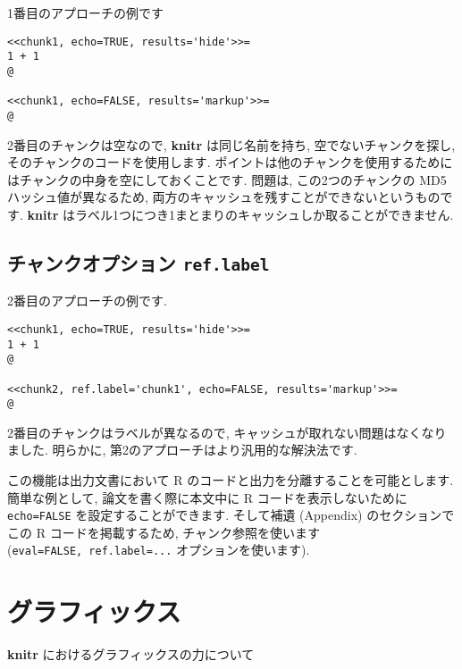 \documentclass[
]{bxjsreport}
\begin{document}
1番目のアプローチの例です

\begin{verbatim}
<<chunk1, echo=TRUE, results='hide'>>=
1 + 1
@

<<chunk1, echo=FALSE, results='markup'>>=
@
\end{verbatim}

2番目のチャンクは空なので, \textbf{knitr} は同じ名前を持ち,
空でないチャンクを探し, そのチャンクのコードを使用します.
ポイントは他のチャンクを使用するためにはチャンクの中身を空にしておくことです.
問題は, この2つのチャンクの MD5 ハッシュ値が異なるため,
両方のキャッシュを残すことができないというものです. \textbf{knitr}
はラベル1つにつき1まとまりのキャッシュしか取ることができません.

\hypertarget{ux30c1ux30e3ux30f3ux30afux30aaux30d7ux30b7ux30e7ux30f3-ref.label}{%
\section*{\texorpdfstring{チャンクオプション
\texttt{ref.label}}{チャンクオプション ref.label}}\label{ux30c1ux30e3ux30f3ux30afux30aaux30d7ux30b7ux30e7ux30f3-ref.label}}

2番目のアプローチの例です.

\begin{verbatim}
<<chunk1, echo=TRUE, results='hide'>>=
1 + 1
@

<<chunk2, ref.label='chunk1', echo=FALSE, results='markup'>>=
@
\end{verbatim}

2番目のチャンクはラベルが異なるので,
キャッシュが取れない問題はなくなりました. 明らかに,
第2のアプローチはより汎用的な解決法です.

この機能は出力文書において R のコードと出力を分離することを可能とします.
簡単な例として, 論文を書く際に本文中に R コードを表示しないために
\texttt{echo=FALSE} を設定することができます. そして補遺 (Appendix)
のセクションでこの R コードを掲載するため, チャンク参照を使います
(\texttt{eval=FALSE,\ ref.label=...} オプションを使います).

\hypertarget{graphics}{%
\chapter*{グラフィックス}\label{graphics}}

\textbf{knitr} におけるグラフィックスの力について
\end{document}
